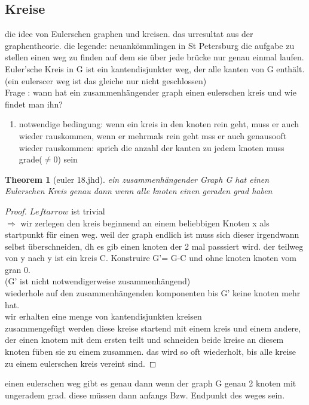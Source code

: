 \documentclass[a4paper]{article}
\newtheorem{theorem}{Theorem}[section]
\theoremstyle{definition}
\theoremstyle{remark}
\begin{document}
\subsection{Kreise}
\label{sub:kreise}

die idee von Eulerschen graphen und kreisen. das urresultat aus der graphentheorie. die legende: neuankömmlingen in St Petersburg die aufgabe zu stellen einen weg zu finden auf dem sie über jede brücke nur genau einmal laufen.\\

Euler'sche Kreis in G ist ein kantendisjunkter weg, der alle kanten von G enthält. \\
(ein eulerscer weg ist das gleiche nur nicht geschlossen)\\
Frage : wann hat ein zusammenhängender graph einen eulerschen kreis und wie findet man ihn?\\
\begin{enumerate}
  \item notwendige bedingung: wenn ein kreis in den knoten rein geht, muss er auch wieder rauskommen, wenn er mehrmals rein geht mss er auch genausooft wieder rauskommen: sprich  die anzahl der kanten zu jedem knoten muss grade($\neq 0$) sein
\end{enumerate}
\begin{theorem}
  [euler 18.jhd]
  ein zusammenhängender Graph G hat einen Eulerschen Kreis genau dann wenn alle knoten einen geraden grad haben
\end{theorem}
\begin{proof}
  $Leftarrow$ ist trivial\\
  $\Rightarrow$ wir zerlegen den kreis beginnend an einem beliebbigen Knoten x als startpunkt für einen weg. weil der graph endlich ist muss sich dieser irgendwann selbst überschneiden, dh es gib einen knoten der 2 mal passsiert wird. der teilweg von y nach y ist  ein kreis C. Konstruire G'= G-C und ohne knoten knoten vom gran 0.\\
  (G' ist nicht notwendigerweise zusammenhängend) \\ wiederhole auf den zusammenhängenden komponenten  bis G' keine knoten mehr hat. \\
wir erhalten eine menge von kantendisjunkten kreisen\\
zusammengefügt werden diese kreise startend mit einem kreis und einem andere, der einen knotem mit dem ersten teilt und schneiden beide kreise an diesem knoten füben sie zu einem zusammen. das wird so oft wiederholt, bis alle kreise zu einem eulerschen kreis vereint sind.
\end{proof}
einen eulerschen weg gibt es genau dann wenn der graph G genau 2 knoten mit ungeradem grad. diese müssen dann anfangs Bzw. Endpunkt des weges sein.
\end{document}
